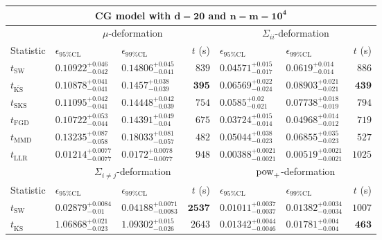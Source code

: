 \begin{tabular}{l|llr|llr}
	\toprule
	\multicolumn{7}{c}{{\bf CG model with $\mathbf{d=20}$ and $\mathbf{n=m=10^{4}}$}} \\
	\toprule
	\multicolumn{1}{c}{} & \multicolumn{3}{c}{$\mu$-deformation} & \multicolumn{3}{c}{$\Sigma_{ii}$-deformation} \\
	Statistic & $\epsilon_{95\%\mathrm{CL}}$ & $\epsilon_{99\%\mathrm{CL}}$ & $t$ (s) & $\epsilon_{95\%\mathrm{CL}}$ & $\epsilon_{99\%\mathrm{CL}}$ & $t$ (s) \\
	\midrule
	$t_{\mathrm{SW}}$ & $0.10922_{-0.042}^{+0.046}$ & $0.14806_{-0.041}^{+0.045}$ & $839$ & $0.04571_{-0.017}^{+0.015}$ & $0.0619_{-0.014}^{+0.014}$ & $886$ \\
	$t_{\overline{\mathrm{KS}}}$ & $0.10878_{-0.041}^{+0.041}$ & $0.1457_{-0.039}^{+0.038}$ & ${\mathbf{395}}$ & $0.06569_{-0.024}^{+0.022}$ & $0.08903_{-0.021}^{+0.021}$ & ${\mathbf{439}}$ \\
	$t_{\mathrm{SKS}}$ & $0.11095_{-0.041}^{+0.042}$ & $0.14448_{-0.039}^{+0.042}$ & $754$ & $0.0585_{-0.021}^{+0.02}$ & $0.07738_{-0.019}^{+0.018}$ & $794$ \\
	$t_{\mathrm{FGD}}$ & ${\mathbf{0.10722_{-0.044}^{+0.053}}}$ & ${\mathbf{0.14391_{-0.04}^{+0.049}}}$ & $675$ & ${\mathbf{0.03724_{-0.014}^{+0.015}}}$ & ${\mathbf{0.04968_{-0.012}^{+0.014}}}$ & $719$ \\
	$t_{\mathrm{MMD}}$ & $0.13235_{-0.058}^{+0.087}$ & $0.18033_{-0.057}^{+0.081}$ & $482$ & $0.05044_{-0.023}^{+0.038}$ & $0.06855_{-0.023}^{+0.035}$ & $527$ \\
	$t_{\mathrm{LLR}}$ & $0.01214_{-0.0077}^{+0.0077}$ & $0.0172_{-0.0077}^{+0.0078}$ & $948$ & $0.00388_{-0.0021}^{+0.0021}$ & $0.00519_{-0.0021}^{+0.0021}$ & $1025$ \\
	\toprule
	\multicolumn{1}{c}{} & \multicolumn{3}{c}{$\Sigma_{i\neq j}$-deformation} & \multicolumn{3}{c}{$\rm{pow}_{+}$-deformation} \\
	Statistic & $\epsilon_{95\%\mathrm{CL}}$ & $\epsilon_{99\%\mathrm{CL}}$ & $t$ (s) & $\epsilon_{95\%\mathrm{CL}}$ & $\epsilon_{99\%\mathrm{CL}}$ & $t$ (s) \\
	\midrule
	$t_{\mathrm{SW}}$ & $0.02879_{-0.01}^{+0.0084}$ & $0.04188_{-0.0083}^{+0.0071}$ & ${\mathbf{2537}}$ & $0.01011_{-0.0037}^{+0.0037}$ & $0.01382_{-0.0034}^{+0.0034}$ & $1007$ \\
	$t_{\overline{\mathrm{KS}}}$ & $1.06868_{-0.023}^{+0.021}$ & $1.09302_{-0.026}^{+0.015}$ & $2643$ & $0.01342_{-0.0046}^{+0.0044}$ & $0.01781_{-0.004}^{+0.004}$ & ${\mathbf{463}}$ \\

\end{tabular}

